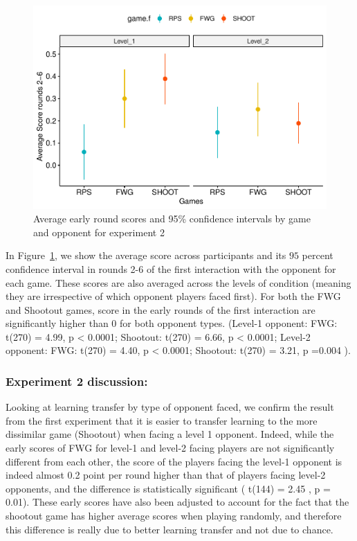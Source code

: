 \documentclass[man,floatsintext]{apa6}
\begin{document}
\begin{figure}

{\centering \includegraphics{draft_upgrade_v1_files/figure-latex/exp2-early-scores-1} 

}

\caption{Average early round scores and 95\% confidence intervals by game and opponent for experiment 2}\label{fig:exp2-early-scores}
\end{figure}

In Figure~\ref{fig:exp2-early-scores}, we show the average score across participants and its \(95\) percent confidence interval in rounds 2-6 of the first interaction with the opponent for each game. These scores are also averaged across the levels of condition (meaning they are irrespective of which opponent players faced first). For both the FWG and Shootout games, score in the early rounds of the first interaction are significantly higher than 0 for both opponent types. (Level-1 opponent: FWG: t(270) = 4.99, p \textless{} 0.0001; Shootout: t(270) = 6.66, p \textless{} 0.0001; Level-2 opponent: FWG: t(270) = 4.40, p \textless{} 0.0001; Shootout: t(270) = 3.21, p =0.004 ).

\hypertarget{experiment-2-discussion}{%
\subsubsection{Experiment 2 discussion:}\label{experiment-2-discussion}}

Looking at learning transfer by type of opponent faced, we confirm the result from the first experiment that it is easier to transfer learning to the more dissimilar game (Shootout) when facing a level 1 opponent. Indeed, while the early scores of FWG for level-1 and level-2 facing players are not significantly different from each other, the score of the players facing the level-1 opponent is indeed almost 0.2 point per round higher than that of players facing level-2 opponents, and the difference is statistically significant ( t(144) = 2.45 , p = 0.01). These early scores have also been adjusted to account for the fact that the shootout game has higher average scores when playing randomly, and therefore this difference is really due to better learning transfer and not due to chance.
\end{document}
